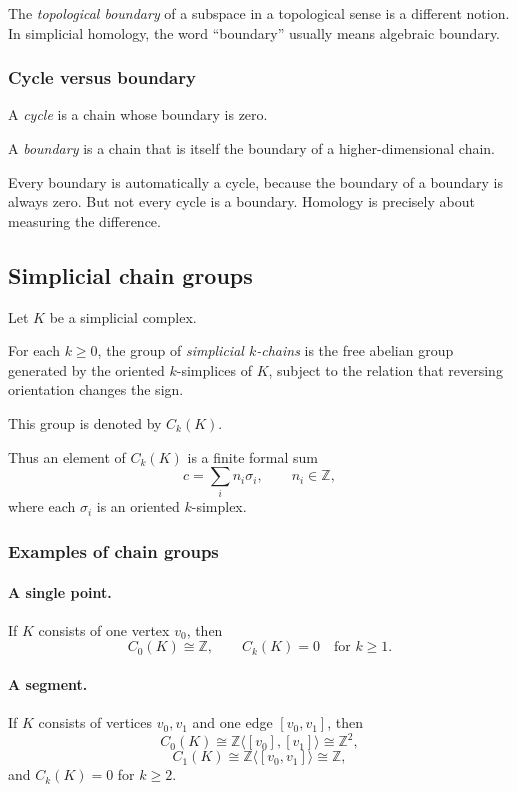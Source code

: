 \documentclass[12pt,a4paper]{article}
\theoremstyle{notespace}
\begin{document}
The \emph{topological boundary} of a subspace in a topological sense is a different notion. In simplicial homology, the word ``boundary'' usually means algebraic boundary.

\subsubsection{Cycle versus boundary}

A \emph{cycle} is a chain whose boundary is zero.

A \emph{boundary} is a chain that is itself the boundary of a higher-dimensional chain.

Every boundary is automatically a cycle, because the boundary of a boundary is always zero. But not every cycle is a boundary. Homology is precisely about measuring the difference.

\subsection{Simplicial chain groups}

Let \(K\) be a simplicial complex.

For each \(k\ge 0\), the group of \emph{simplicial \(k\)-chains} is the free abelian group generated by the oriented \(k\)-simplices of \(K\), subject to the relation that reversing orientation changes the sign.

This group is denoted by \(C_k(K)\).

Thus an element of \(C_k(K)\) is a finite formal sum
\[
c=\sum_i n_i \sigma_i,
\qquad n_i\in \mathbb{Z},
\]
where each \(\sigma_i\) is an oriented \(k\)-simplex.

\subsubsection{Examples of chain groups}

\paragraph{A single point.}
If \(K\) consists of one vertex \(v_0\), then
\[
C_0(K)\cong \mathbb{Z},
\qquad
C_k(K)=0 \quad\text{for } k\ge 1.
\]

\paragraph{A segment.}
If \(K\) consists of vertices \(v_0,v_1\) and one edge \([v_0,v_1]\), then
\[
C_0(K)\cong \mathbb{Z}\langle [v_0],[v_1]\rangle \cong \mathbb{Z}^2,
\]
\[
C_1(K)\cong \mathbb{Z}\langle [v_0,v_1]\rangle \cong \mathbb{Z},
\]
and \(C_k(K)=0\) for \(k\ge 2\).
\end{document}
